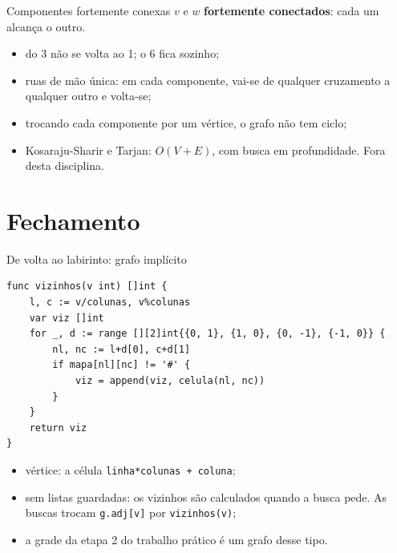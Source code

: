 \documentclass{beamer}
\begin{document}
\begin{frame}{Componentes fortemente conexas}
	$v$ e $w$ \textbf{fortemente conectados}: cada um alcança o outro.

	\begin{center}
		\scalebox{0.85}{\grafoCFC}
	\end{center}

	\begin{itemize}
		\item do 3 não se volta ao 1; o 6 fica sozinho;
		\item ruas de mão única: em cada componente, vai-se de qualquer
		      cruzamento a qualquer outro e volta-se;
		\item trocando cada componente por um vértice, o grafo não tem ciclo;
		\item Kosaraju-Sharir e Tarjan: $O(V + E)$, com busca em profundidade.
		      Fora desta disciplina.
	\end{itemize}
\end{frame}

\section{Fechamento}

\begin{frame}[fragile]{De volta ao labirinto: grafo implícito}
	\begin{verbatim}
func vizinhos(v int) []int {
	l, c := v/colunas, v%colunas
	var viz []int
	for _, d := range [][2]int{{0, 1}, {1, 0}, {0, -1}, {-1, 0}} {
		nl, nc := l+d[0], c+d[1]
		if mapa[nl][nc] != '#' {
			viz = append(viz, celula(nl, nc))
		}
	}
	return viz
}
\end{verbatim}

	\begin{itemize}
		\item vértice: a célula \texttt{linha*colunas + coluna};
		\item sem listas guardadas: os vizinhos são calculados quando a busca
		      pede. As buscas trocam \texttt{g.adj[v]} por \texttt{vizinhos(v)};
		\item a grade da etapa 2 do trabalho prático é um grafo desse tipo.
	\end{itemize}
\end{frame}
\end{document}
